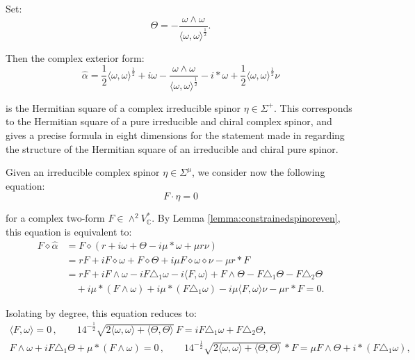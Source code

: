 \documentclass[10pt,a4paper,twoside,reqno]{amsart}
\theoremstyle{plain}
\theoremstyle{definition}
\theoremstyle{remark}
\def\C{\mathbb{C}}
\newcommand{\escal}[1]{\langle#1\rangle}
\begin{document}
\noindent
Set: 
\begin{equation*}
\Theta = -\frac{\omega\wedge\omega }{\escal{\omega,\omega}^{\frac{1}{2}}}.
\end{equation*}

\noindent
Then the complex exterior form: 
\begin{equation*}
\widehat{\alpha}=\frac{1}{2}\escal{\omega,\omega}^{\frac{1}{2}}+i\omega -\frac{\omega\wedge\omega }{\escal{\omega,\omega}^{\frac{1}{2}}} -i*\omega+\frac{1}{2}\escal{\omega,\omega}^{\frac{1}{2}}\nu    
\end{equation*}

\noindent
is the Hermitian square of a complex irreducible spinor $\eta\in\Sigma^+$. This corresponds to the Hermitian square of a pure irreducible and chiral complex spinor, and gives a precise formula in eight dimensions for the statement made in \cite{Wang89} regarding the structure of the Hermitian square of an irreducible and chiral pure spinor.\medskip

Given an irreducible complex spinor $\eta\in \Sigma^{\mu}$, we consider now the following equation:
\begin{equation*}
F\cdot \eta = 0
\end{equation*}

\noindent
for a complex two-form $F\in \wedge^2 V^{\ast}_{\C}$. By Lemma \ref{lemma:constrainedspinoreven}, this equation is equivalent to:
\begin{align*}
F\diamond \widehat{\alpha} & = F\diamond (r+i\omega+\Theta-i\mu*\omega+\mu r\nu ) \\
& = rF + i F\diamond \omega + F\diamond \Theta + i\mu F\diamond \omega\diamond \nu - \mu r \ast F\\
& = r F + i F\wedge \omega - i F \triangle_1 \omega - i \langle F , \omega \rangle + F\wedge \Theta - F\triangle_1 \Theta - F\triangle_2 \Theta \\
&\quad + i \mu \ast (F\wedge \omega) + i\mu \ast (F\triangle_1\omega) - i \mu \langle F , \omega \rangle \nu - \mu r\ast F = 0.
\end{align*}

\noindent
Isolating by degree, this equation reduces to:
\begin{equation}
\label{eq:algebraicF8d}
\begin{gathered}
\langle F , \omega \rangle = 0\, , \qquad   14^{-\frac{1}{2}}\sqrt{ 2\escal{\omega,\omega}+\escal{\Theta,\Theta}} \, F  = i F \triangle_1 \omega  + F\triangle_2 \Theta,\\
F\wedge \omega  + i F\triangle_1 \Theta  +  \mu \ast (F\wedge \omega)   = 0\, , \qquad 14^{-\frac{1}{2}}\sqrt{ 2\escal{\omega,\omega}+\escal{\Theta,\Theta}} \,\ast F = \mu F\wedge \Theta + i \ast (F\triangle_1\omega),
\end{gathered}
\end{equation}
\end{document}

